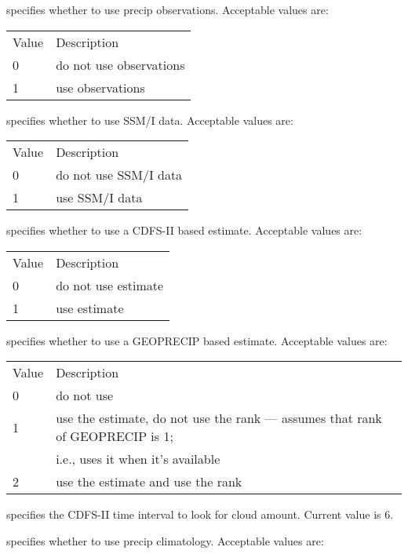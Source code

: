   specifies whether to use
 precip observations.
 Acceptable values are:

 \begin{tabular}{ll}
 Value & Description             \\
 0     & do not use observations \\
 1     & use observations        \\
 \end{tabular}

  specifies whether to use SSM/I data.
 Acceptable values are:

 \begin{tabular}{ll}
 Value & Description           \\
 0     & do not use SSM/I data \\
 1     & use SSM/I data        \\
 \end{tabular}

  specifies whether to use
 a CDFS-II based estimate.
 Acceptable values are:

 \begin{tabular}{ll}
 Value & Description         \\
 0     & do not use estimate \\
 1     & use estimate        \\
 \end{tabular}

  specifies whether to use
 a GEOPRECIP based estimate. 
 Acceptable values are:

 \begin{tabular}{ll}
 Value & Description                                \\
 0     & do not use                                 \\
 1     & use the estimate, do not use the rank --- 
         assumes that rank of GEOPRECIP is 1;       \\
       & i.e., uses it when it's available          \\
 2     & use the estimate and use the rank          \\
 \end{tabular}

  specifies the CDFS-II time interval
 to look for cloud amount. Current value is 6.

  specifies whether to use 
 precip climatology.
 Acceptable values are:

